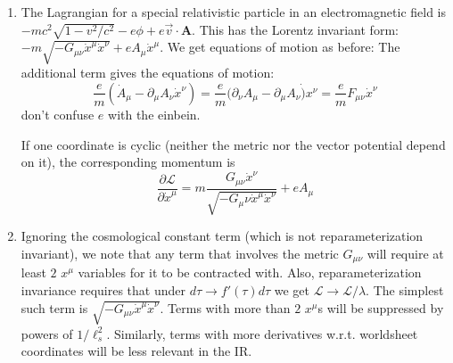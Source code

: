 \documentclass[11pt, class=article, crop=false]{standalone}
\begin{document}
\begin{enumerate}
		\item The Lagrangian for a special relativistic particle in an electromagnetic field is $-mc^2 \sqrt{1-v^2/c^2} - e \phi + e \vec v \cdot \mathbf{A}$. This has the Lorentz invariant form: $-m \sqrt{-G_{\mu \nu} \dot x^\mu \dot x^\nu} + e A_\mu \dot x^\mu$. We get equations of motion as before: 
		The additional term gives the equations of motion:
		\begin{equation}
			\frac{e}{m} (\dot A_\mu - \partial_\mu A_\nu \dot x^\nu) =  \frac{e}{m} (\partial_\nu A_\mu - \partial_\mu A_\nu \dot) x^\nu =  \frac{e}{m} F_{\mu \nu} \dot x^\nu
		\end{equation}
		don't confuse $e$ with the einbein. 
		
		If one coordinate is cyclic (neither the metric nor the vector potential depend on it), the corresponding momentum is 
		\begin{equation}
			\frac{\partial \mathcal L}{\partial \dot x^\mu} = m\frac{G_{\mu \nu} \dot x^\nu}{\sqrt{-G_\mu \nu \dot x^\mu \dot x^\nu}} + e A_\mu
		\end{equation}
		
		\item Ignoring the cosmological constant term (which is not reparameterization invariant), we note that any term that involves the metric $G_{\mu \nu}$ will require at least $2$ $x^\mu$ variables for it to be contracted with. Also, reparameterization invariance requires that under $d\tau \to f'(\tau) d\tau$ we get $\mathcal L \to \mathcal L/\lambda$. The simplest such term is $\sqrt{-G_{\mu \nu} \dot x^\mu \dot x^\nu}$. Terms with more than $2$ $x^\mu$s will be suppressed by powers of $1/\ell_s^2$. Similarly, terms with more derivatives w.r.t. worldsheet coordinates will be less relevant in the IR. 
		

\end{enumerate}
\end{document}
